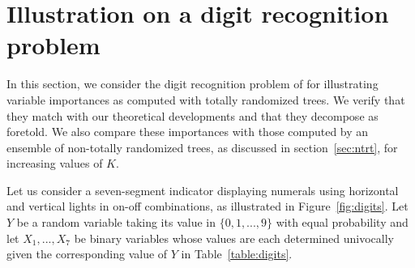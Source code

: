 \documentclass{article}
\begin{document}



\section{Illustration on a digit recognition problem}
\label{sec:example}

In this section, we consider the digit recognition
problem of \citep{breiman1984cart} for illustrating variable importances as
computed with totally randomized trees. We verify that they match with our
theoretical developments and that they decompose as foretold. We also compare
these importances with those computed by an ensemble of non-totally randomized
trees, as discussed in section~\ref{sec:ntrt}, for increasing values of $K$.

Let us consider a seven-segment indicator displaying numerals using horizontal and
vertical lights in on-off combinations, as illustrated in
Figure~\ref{fig:digits}. Let $Y$ be a random variable taking its value in $\{0, 1,
..., 9\}$ with equal probability and  let $X_1, ..., X_7$ be binary variables
whose values are each determined univocally given the corresponding value of $Y$
in Table~\ref{table:digits}.
\end{document}
